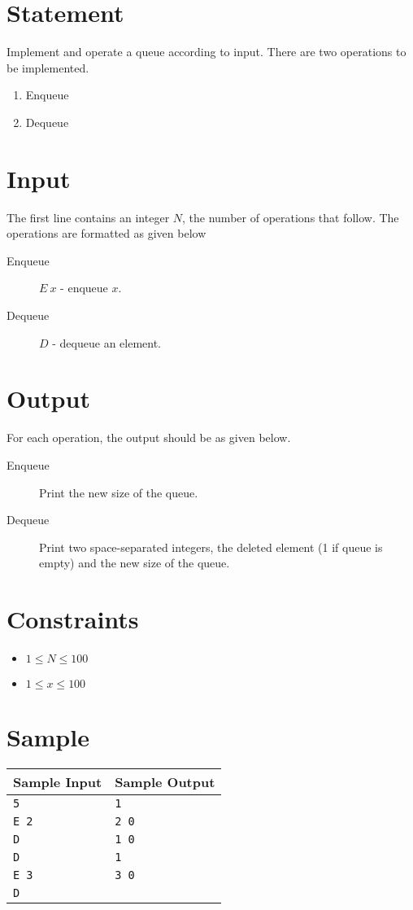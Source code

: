 \documentclass{article}
\begin{document}
\section*{Statement}

Implement and operate a queue according to input. There are two operations to be implemented.

\begin{enumerate}
    \item Enqueue
    \item Dequeue
\end{enumerate}

\section*{Input}

The first line contains an integer $N$, the number of operations that follow. The operations are formatted as given below

\begin{description}
    \item[Enqueue] $E\ x$ - enqueue $x$.
    \item[Dequeue] $D$ - dequeue an element.
\end{description}

\section*{Output}

For each operation, the output should be as given below.

\begin{description}
    \item[Enqueue] Print the new size of the queue.
    \item[Dequeue] Print two space-separated integers, the deleted element (1 if queue is empty) and the new size of the queue.
\end{description}

\section*{Constraints}

\begin{itemize}
    \item $1 \le N \le 100$
    \item $1 \le x \le 100$
\end{itemize}

\section*{Sample}

\begin{tabular}{l|l}
    \hline
    \hline
    Sample Input & Sample Output \\
    \hline
    \verb+5+ & \verb+1+ \\
    \verb+E 2+ & \verb+2 0+ \\
    \verb+D+ & \verb+1 0+ \\
    \verb+D+ & \verb+1+ \\
    \verb+E 3+ & \verb+3 0+ \\
    \verb+D+ & \verb++ \\
    \hline
\end{tabular}
\end{document}
